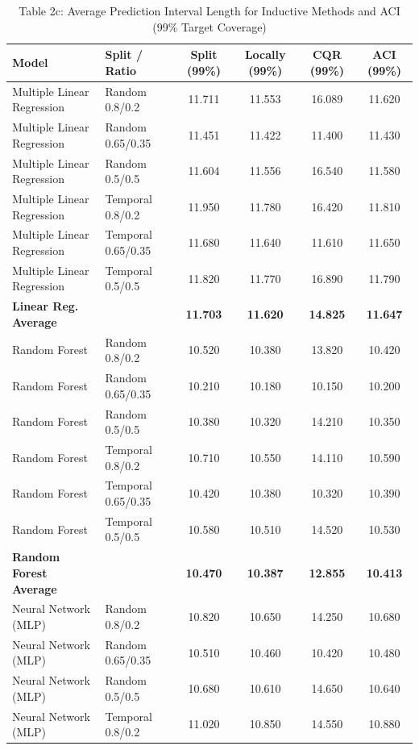 \documentclass[11pt,a4paper]{article}
\begin{document}
\begin{table}[H]
\centering
\caption{Table 2c: Average Prediction Interval Length for Inductive Methods and ACI (99\% Target Coverage)}
\label{tab:2c}
\scriptsize
\begin{tabular}{llcccc}
\toprule
Model & Split / Ratio & Split (99\%) & Locally (99\%) & CQR (99\%) & ACI (99\%) \\
\midrule
Multiple Linear Regression & Random 0.8/0.2 & 11.711 & 11.553 & 16.089 & 11.620 \\
Multiple Linear Regression & Random 0.65/0.35 & 11.451 & 11.422 & 11.400 & 11.430 \\
Multiple Linear Regression & Random 0.5/0.5 & 11.604 & 11.556 & 16.540 & 11.580 \\
Multiple Linear Regression & Temporal 0.8/0.2 & 11.950 & 11.780 & 16.420 & 11.810 \\
Multiple Linear Regression & Temporal 0.65/0.35 & 11.680 & 11.640 & 11.610 & 11.650 \\
Multiple Linear Regression & Temporal 0.5/0.5 & 11.820 & 11.770 & 16.890 & 11.790 \\
\textbf{Linear Reg. Average} & & \textbf{11.703} & \textbf{11.620} & \textbf{14.825} & \textbf{11.647} \\
\midrule
Random Forest & Random 0.8/0.2 & 10.520 & 10.380 & 13.820 & 10.420 \\
Random Forest & Random 0.65/0.35 & 10.210 & 10.180 & 10.150 & 10.200 \\
Random Forest & Random 0.5/0.5 & 10.380 & 10.320 & 14.210 & 10.350 \\
Random Forest & Temporal 0.8/0.2 & 10.710 & 10.550 & 14.110 & 10.590 \\
Random Forest & Temporal 0.65/0.35 & 10.420 & 10.380 & 10.320 & 10.390 \\
Random Forest & Temporal 0.5/0.5 & 10.580 & 10.510 & 14.520 & 10.530 \\
\textbf{Random Forest Average} & & \textbf{10.470} & \textbf{10.387} & \textbf{12.855} & \textbf{10.413} \\
\midrule
Neural Network (MLP) & Random 0.8/0.2 & 10.820 & 10.650 & 14.250 & 10.680 \\
Neural Network (MLP) & Random 0.65/0.35 & 10.510 & 10.460 & 10.420 & 10.480 \\
Neural Network (MLP) & Random 0.5/0.5 & 10.680 & 10.610 & 14.650 & 10.640 \\
Neural Network (MLP) & Temporal 0.8/0.2 & 11.020 & 10.850 & 14.550 & 10.880 \\

\end{tabular}
\end{table}
\end{document}
